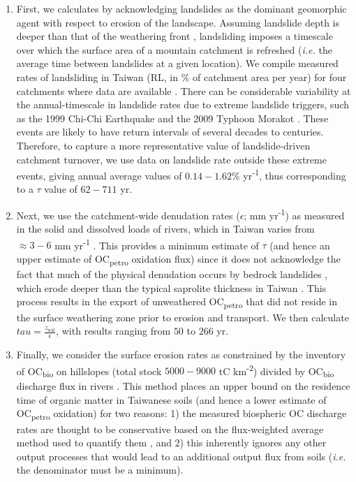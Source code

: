 \begin{enumerate}[label=(\textit{\roman*})]

\item First, we calculates  by acknowledging landslides as the dominant geomorphic agent with respect to erosion of the landscape. Assuming landslide depth is deeper than that of the weathering front \citep[$\approx 0.8$ m;][]{Tsai:2001vp}, landsliding imposes a timescale over which the surface area of a mountain catchment is refreshed (\textit{i.e.} the average time between landslides at a given location). We compile measured rates of landsliding in Taiwan (RL, in \% of catchment area per year) for four catchments where data are available \citep[Table \ref{Ch6Tab:S8};][]{Chang:2002wr,Chang:2007fm,Lin:2008fy,Chen:2013eh,Chen:2015hs}. There can be considerable variability at the annual-timescale in landslide rates \citep{Lin:2008fy} due to extreme landslide triggers, such as the 1999 Chi-Chi Earthquake \citep{Hovius:2011kc} and the 2009 Typhoon Morakot \citep{West:2011eo}. These events are likely to have return intervals of several decades to centuries. Therefore, to capture a more representative value of landslide-driven catchment turnover, we use data on landslide rate outside these extreme events, giving annual average values of $0.14 - 1.62$\% yr\textsuperscript{-1}, thus corresponding to a $\tau$ value of $62 - 711$ yr.

\item Next, we use the catchment-wide denudation rates ($\epsilon$; mm yr\textsuperscript{-1}) as measured in the solid and dissolved loads of rivers, which in Taiwan varies from $\approx 3 - 6$ mm yr\textsuperscript{-1} \citep{Dadson:2003kl}. This provides a minimum estimate of $\tau$ (and hence an upper estimate of OC\textsubscript{petro} oxidation flux) since it does not acknowledge the fact that much of the physical denudation occurs by bedrock landslides \citep{Hovius:2000ht}, which erode deeper than the typical saprolite thickness in Taiwan \citep[\textit{i.e.} $\approx 0.8 m$;][]{Tsai:2001vp,Larsen:2010dr}. This process results in the export of unweathered OC\textsubscript{petro} that did not reside in the surface weathering zone prior to erosion and transport. We then calculate $tau = \frac{z_{\text{soil}}}{\epsilon}$, with results ranging from $50$ to $266$ yr.

\item Finally, we consider the surface erosion rates as constrained by the inventory of OC\textsubscript{bio} on hillslopes (total stock $5000 - 9000$ tC km\textsuperscript{-2}) divided by OC\textsubscript{bio} discharge flux in rivers \citep[$11 - 31$ tons C km\textsuperscript{-2} yr\textsuperscript{-1};][]{Hilton:2012dt}. This method places an upper bound on the residence time of organic matter in Taiwanese soils (and hence a lower estimate of OC\textsubscript{petro} oxidation) for two reasons: 1) the measured biospheric OC discharge rates are thought to be conservative based on the flux-weighted average method used to quantify them \citep{Hilton:2012dt}, and 2) this inherently ignores any other output processes that would lead to an additional output flux from soils (\textit{i.e.} the denominator must be a minimum).


\end{enumerate}
